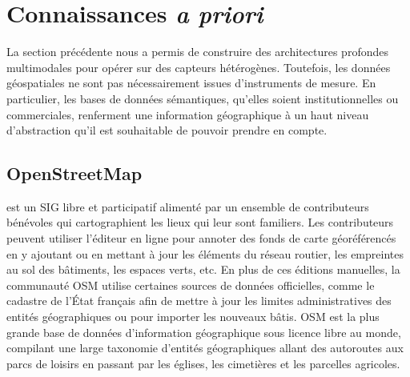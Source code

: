 

\section{Connaissances \textit{a priori}}
\label{sec:joint}

La section précédente nous a permis de construire des architectures profondes multimodales pour opérer sur des capteurs hétérogènes. Toutefois, les données géospatiales ne sont pas nécessairement issues d'instruments de mesure. En particulier, les bases de données sémantiques, qu'elles soient institutionnelles ou commerciales, renferment une information géographique à un haut niveau d'abstraction qu'il est souhaitable de pouvoir prendre en compte.

\subsection{OpenStreetMap}

 est un \gls{SIG} libre et participatif alimenté par un ensemble de contributeurs bénévoles qui cartographient les lieux qui leur sont familiers. Les contributeurs peuvent utiliser l'éditeur en ligne pour annoter des fonds de carte géoréférencés en y ajoutant ou en mettant à jour les éléments du réseau routier, les empreintes au sol des bâtiments, les espaces verts, etc. En plus de ces éditions manuelles, la communauté \gls{OSM} utilise certaines sources de données officielles, comme le cadastre de l'État français afin de mettre à jour les limites administratives des entités géographiques ou pour importer les nouveaux bâtis. \gls{OSM} est la plus grande base de données d'information géographique sous licence libre au monde, compilant une large taxonomie d'entités géographiques allant des autoroutes aux parcs de loisirs en passant par les églises, les cimetières et les parcelles agricoles.

